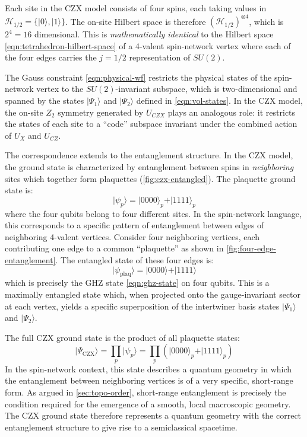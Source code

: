 \documentclass[preprint]{SciPost}
\newcommand{\mc}[1]{\mathcal{#1}}
\newcommand{\ket}[1]{\vert #1 \rangle}
\theoremstyle{plain} %
\begin{document}
Each site in the CZX model consists of four spins, each taking values in $ \mc{H}_{1/2} = \{ \ket{0}, \ket{1} \} $. The on-site Hilbert space is therefore $ (\mc{H}_{1/2})^{\otimes 4} $, which is $ 2^4 = 16 $ dimensional. This is \emph{mathematically identical} to the Hilbert space \eqref{eqn:tetrahedron-hilbert-space} of a 4-valent spin-network vertex where each of the four edges carries the $ j = 1/2 $ representation of $ SU(2) $.

The Gauss constraint \eqref{eqn:physical-wf} restricts the physical states of the spin-network vertex to the $ SU(2) $-invariant subspace, which is two-dimensional and spanned by the states $ \ket{\Psi_1} $ and $ \ket{\Psi_2} $ defined in \eqref{eqn:vol-states}. In the CZX model, the on-site $ Z_2 $ symmetry generated by $ U_{CZX} $ plays an analogous role: it restricts the states of each site to a ``code'' subspace invariant under the combined action of $ U_X $ and $ U_{CZ} $.

The correspondence extends to the entanglement structure. In the CZX model, the ground state is characterized by entanglement between spins in \emph{neighboring} sites which together form plaquettes (\autoref{fig:czx-entangled}). The plaquette ground state is:
\begin{equation}\label{eqn:czx-plaquette-state}
	\ket{\psi_p} = \ket{0000}_p + \ket{1111}_p
\end{equation}
where the four qubits belong to four different sites. In the spin-network language, this corresponds to a specific pattern of entanglement between edges of neighboring 4-valent vertices. Consider four neighboring vertices, each contributing one edge to a common ``plaquette'' as shown in \autoref{fig:four-edge-entanglement}. The entangled state of these four edges is:
\begin{equation}\label{eqn:sn-plaquette-state}
	\ket{\psi_{\text{plaq}}} = \ket{0000} + \ket{1111}
\end{equation}
which is precisely the GHZ state \eqref{eqn:ghz-state} on four qubits. This is a maximally entangled state which, when projected onto the gauge-invariant sector at each vertex, yields a specific superposition of the intertwiner basis states $ \ket{\Psi_1} $ and $ \ket{\Psi_2} $.

The full CZX ground state is the product of all plaquette states:
\begin{equation}\label{eqn:czx-full-gs}
	\ket{\Psi_{\text{CZX}}} = \prod_p \ket{\psi_p} = \prod_p \left( \ket{0000}_p + \ket{1111}_p \right)
\end{equation}
In the spin-network context, this state describes a quantum geometry in which the entanglement between neighboring vertices is of a very specific, short-range form. As argued in \autoref{sec:topo-order}, short-range entanglement is precisely the condition required for the emergence of a smooth, local macroscopic geometry. The CZX ground state therefore represents a quantum geometry with the correct entanglement structure to give rise to a semiclassical spacetime.
\end{document}
